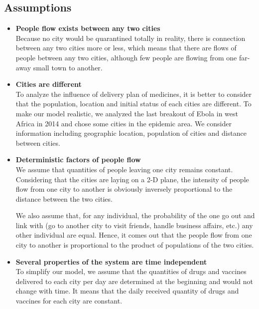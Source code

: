 \subsection{Assumptions}
\begin{itemize}
  \item \textbf{People flow exists between any two cities }\\
  Because no city would be quarantined totally in reality, there is connection between any two cities more or less, which means that there are flows of people between any two cities, although few people are flowing from one far-away small town to another.
  \item \textbf{Cities are different}\\
  To analyze the influence of delivery plan of medicines, it is better to consider that the population, location and initial status of each cities are different. To make our model realistic, we analyzed the last breakout of Ebola in west Africa in 2014 and chose some cities in the epidemic area. We consider information including geographic location, population of cities and distance between cities.
  \item \textbf{Deterministic factors of people flow}\\
  We assume that quantities of people leaving one city remains constant. Considering that the cities are laying on a 2-D plane, the intensity of people flow from one city to another is obviously inversely proportional to the distance between the two cities.
  
  We also assume that, for any individual, the probability of the one go out and link with (go to another city to visit friends, handle business affairs, etc.) any other individual are equal. Hence, it comes out that the people flow from one city to another is proportional to the product of populations of the two cities.

  \item \textbf{Several properties of the system are time independent}\\
To simplify our model, we assume that the quantities of drugs and vaccines delivered to each city per day are determined at the beginning and would not change with time. It means that the daily received quantity of drugs and vaccines for each city are constant. %
  

\end{itemize}
